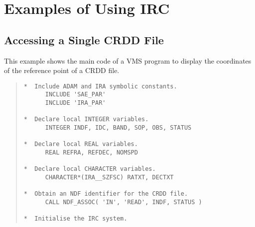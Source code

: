 \section {Examples of Using IRC}
\label{APP:EXAMS}
\subsection {Accessing a Single CRDD File}
This example shows the main code of a VMS program to display the coordinates of
the reference point of a CRDD file.

\begin{quote}
\begin{tabbing} %

\verb#*  Include ADAM and IRA symbolic constants.            #\\
\verb#      INCLUDE 'SAE_PAR'                                #\\
\verb#      INCLUDE 'IRA_PAR'                                #\\
\verb#                                                       #\\
\verb#*  Declare local INTEGER variables.                    #\\
\verb#      INTEGER INDF, IDC, BAND, SOP, OBS, STATUS        #\\
\verb#                                                       #\\
\verb#*  Declare local REAL variables.                       #\\
\verb#      REAL REFRA, REFDEC, NOMSPD                       #\\
\verb#                                                       #\\
\verb#*  Declare local CHARACTER variables.                  #\\
\verb#      CHARACTER*(IRA__SZFSC) RATXT, DECTXT             #\\
\verb#                                                       #\\
\verb#*  Obtain an NDF identifier for the CRDD file.         #\\
\verb#      CALL NDF_ASSOC( 'IN', 'READ', INDF, STATUS )     #\\
\verb#                                                       #\\
\verb#*  Initialise the IRC system.                          #\\

\end{tabbing}
\end{quote}

